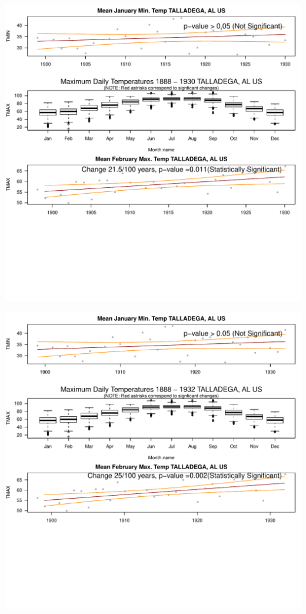 \documentclass{article}\usepackage[]{graphicx}\usepackage[]{color}
\makeatletter
\def\maxwidth{ %
  \ifdim\Gin@nat@width>\linewidth
    \linewidth
  \else
    \Gin@nat@width
  \fi
}
\newenvironment{knitrout}{}{} %
\makeatother
\begin{document}
\begin{knitrout}
\includegraphics[width=\maxwidth]{figure/static_template-11} 

\includegraphics[width=\maxwidth]{figure/static_template-12} 


\end{knitrout}
\end{document}
